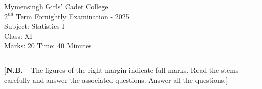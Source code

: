 \documentclass[12pt]{article}
\begin{document}
\begin{center}
Mymensingh Girls' Cadet College \\
$2^{nd}$ Term Fornightly Examination - 2025 \\
Subject: Statistics-I \\
Class: XI \\
Marks: 20 \hfill Time: 40 Minutes
\end{center}



\hrule


\begin{center}
[\textbf{N.B.} – The figures of the right margin indicate full marks. Read 
the stems carefully and answer the associated questions. Answer all the questions.]\\
\end{center}

\end{document}
